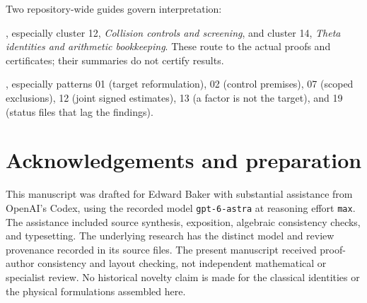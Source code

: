 \documentclass[11pt,letterpaper]{article}
\numberwithin{equation}{section}
\theoremstyle{remark}
\newcommand{\evid}[1]{\textsf{[#1]}}
\begin{document}
Two repository-wide guides govern interpretation:
\begin{description}[style=nextline,leftmargin=2.5em]
\item[\evid{C1}] , especially cluster 12,
\emph{Collision controls and screening}, and cluster 14,
\emph{Theta identities and arithmetic bookkeeping}. These route to the
actual proofs and certificates; their summaries do not certify results.
\item[\evid{C2}] , especially patterns 01
(target reformulation), 02 (control premises), 07 (scoped exclusions),
12 (joint signed estimates), 13 (a factor is not the target), and 19
(status files that lag the findings).
\end{description}

\section*{Acknowledgements and preparation}
This manuscript was drafted for Edward Baker with substantial assistance
from OpenAI's Codex, using the recorded model \texttt{gpt-6-astra} at
reasoning effort \texttt{max}. The assistance included source synthesis,
exposition, algebraic consistency checks, and typesetting. The underlying
research has the distinct model and review provenance recorded in its
source files. The present manuscript received proof-author consistency
and layout checking, not independent mathematical or specialist review.
No historical novelty claim is made for the classical identities or the
physical formulations assembled here.



\end{document}
